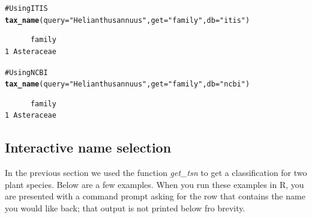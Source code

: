 \documentclass[letterpaper,superscriptaddress,showkeys,longbibliography,10pt]{revtex4-1}\usepackage{graphicx, color}
\makeatletter
\newcommand{\hlfunctioncall}[1]{\textcolor[rgb]{0.501960784313725,0,0.329411764705882}{\textbf{#1}}}%
\newcommand{\hlstring}[1]{\textcolor[rgb]{0.6,0.6,1}{#1}}%
\newcommand{\hlcomment}[1]{\textcolor[rgb]{0.180392156862745,0.6,0.341176470588235}{#1}}%
\newenvironment{kframe}{%
 \def\at@end@of@kframe{}%
 \ifinner\ifhmode%
  \def\at@end@of@kframe{\end{minipage}}%
  \begin{minipage}{\columnwidth}%
 \fi\fi%
 \def\FrameCommand##1{\hskip\@totalleftmargin \hskip-\fboxsep
 \colorbox{shadecolor}{##1}\hskip-\fboxsep
     \hskip-\linewidth \hskip-\@totalleftmargin \hskip\columnwidth}%
 \MakeFramed {\advance\hsize-\width
   \@totalleftmargin\z@ \linewidth\hsize
   \@setminipage}}%
 {\par\unskip\endMakeFramed%
 \at@end@of@kframe}
\newenvironment{knitrout}{}{} %
\makeatother
\begin{document}
\begin{knitrout}
\color{fgcolor}\begin{kframe}
\begin{alltt}
\hlcomment{# Using ITIS}
\hlfunctioncall{tax_name}(query = \hlstring{"Helianthus annuus"}, get = \hlstring{"family"}, db = \hlstring{"itis"})
\end{alltt}
\begin{verbatim}
      family
1 Asteraceae
\end{verbatim}
\begin{alltt}

\hlcomment{# Using NCBI}
\hlfunctioncall{tax_name}(query = \hlstring{"Helianthus annuus"}, get = \hlstring{"family"}, db = \hlstring{"ncbi"})
\end{alltt}
\begin{verbatim}
      family
1 Asteraceae
\end{verbatim}
\end{kframe}
\end{knitrout}


\subsection{Interactive name selection}

In the previous section we used the function \emph{get\_tsn} to get a classification for two plant species. Below are a few examples. When you run these examples in R, you are presented with a command prompt asking for the row that contains the name you would like back; that output is not printed below fro brevity.
\end{document}

